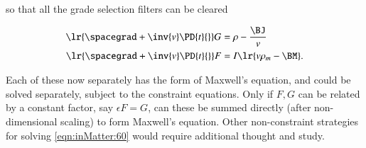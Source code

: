 so that all the grade selection filters can be cleared

\begin{dmath}\label{eqn:inMatter:220}
\begin{aligned}
\lr{ \spacegrad + \inv{v} \PD{t}{} } G &= \rho - \frac{\BJ}{v} \\
\lr{ \spacegrad + \inv{v} \PD{t}{} } F &= I \lr{ v \rho_m - \BM }.
\end{aligned}
\end{dmath}

Each of these now separately has the form of Maxwell's equation, and could be solved separately, subject to the constraint equations.
Only if \( F, G \) can be related by a constant factor, say \( \epsilon F = G \), can these be summed directly (after non-dimensional scaling) to form Maxwell's equation.
Other non-constraint strategies for solving \cref{eqn:inMatter:60} would require additional thought and study.
